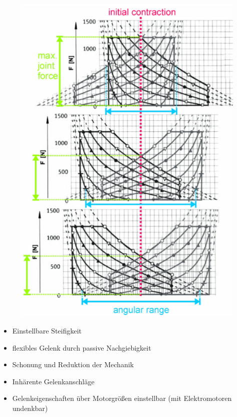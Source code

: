 \begin{figure}[h!]
	\centering
	\includegraphics[width=0.4\linewidth]{figures/ch03_zwei-muskeln1.png}
	\caption{}
	\label{zm1}
\end{figure}
\begin{itemize}
	\item Einstellbare Steifigkeit
	\item flexibles Gelenk durch passive Nachgiebigkeit
	\item Schonung und Reduktion der Mechanik
	\item Inhärente Gelenkanschläge
	\item Gelenkeigenschaften über Motorgrößen einstellbar (mit Elektromotoren undenkbar)
\end{itemize}
